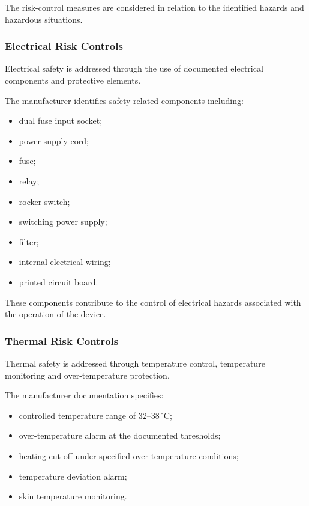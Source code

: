 The risk-control measures are considered in relation to the identified
hazards and hazardous situations.

\subsubsection{Electrical Risk Controls}

Electrical safety is addressed through the use of documented electrical
components and protective elements.

The manufacturer identifies safety-related components including:

\begin{itemize}

    \item dual fuse input socket;

    \item power supply cord;

    \item fuse;

    \item relay;

    \item rocker switch;

    \item switching power supply;

    \item filter;

    \item internal electrical wiring;

    \item printed circuit board.

\end{itemize}

These components contribute to the control of electrical hazards associated
with the operation of the device.

\subsubsection{Thermal Risk Controls}

Thermal safety is addressed through temperature control, temperature
monitoring and over-temperature protection.

The manufacturer documentation specifies:

\begin{itemize}

    \item controlled temperature range of $32$--$38\,^\circ$C;

    \item over-temperature alarm at the documented thresholds;

    \item heating cut-off under specified over-temperature conditions;

    \item temperature deviation alarm;

    \item skin temperature monitoring.

\end{itemize}

